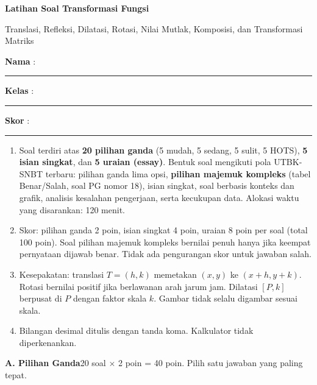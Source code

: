 \documentclass[a4paper,11pt]{article}
\newcounter{no}
\newcommand{\bagian}[2]{\par\Needspace{6\baselineskip}\vspace{1.0em}\noindent
  \begin{tcolorbox}[colback=tealx,colframe=tealx,coltext=white,boxrule=0pt,arc=2pt,left=6pt,right=6pt,top=3pt,bottom=3pt]
  \textbf{#1}\hfill{\small #2}\end{tcolorbox}\setcounter{no}{0}\par\vspace{-0.3em}}
\begin{document}
\thispagestyle{fancy}

\begin{center}
  {\color{tealx}\fontsize{22}{26}\selectfont\bfseries Latihan Soal Transformasi Fungsi\par}
  \vspace{2pt}
  {\color{aquax}\large Translasi, Refleksi, Dilatasi, Rotasi, Nilai Mutlak, Komposisi, dan Transformasi Matriks\par}
\end{center}
\vspace{2pt}
\begin{tcolorbox}[colback=softbg,colframe=tealx!40,boxrule=0.6pt,arc=3pt,left=8pt,right=8pt,top=5pt,bottom=5pt]
\noindent\textbf{Nama} : \rule{4.6cm}{0.4pt}\hfill\textbf{Kelas} : \rule{2.2cm}{0.4pt}\hfill\textbf{Skor} : \rule{2.2cm}{0.4pt}
\end{tcolorbox}
\vspace{2pt}
\begin{tcolorbox}[colback=white,colframe=aquax,boxrule=0.8pt,arc=3pt,left=8pt,right=8pt,top=4pt,bottom=4pt,title={\bfseries Petunjuk Pengerjaan},coltitle=white,fonttitle=\small]
\small
\begin{enumerate}[leftmargin=1.4em,itemsep=1pt,topsep=1pt]
\item Soal terdiri atas \textbf{20 pilihan ganda} (5 mudah, 5 sedang, 5 sulit, 5 HOTS), \textbf{5 isian singkat}, dan \textbf{5 uraian (essay)}. Bentuk soal mengikuti pola UTBK-SNBT terbaru: pilihan ganda lima opsi, \textbf{pilihan majemuk kompleks} (tabel Benar/Salah, soal PG nomor 18), isian singkat, soal berbasis konteks dan grafik, analisis kesalahan pengerjaan, serta kecukupan data. Alokasi waktu yang disarankan: 120 menit.
\item Skor: pilihan ganda 2 poin, isian singkat 4 poin, uraian 8 poin per soal (total 100 poin). Soal pilihan majemuk kompleks bernilai penuh hanya jika keempat pernyataan dijawab benar. Tidak ada pengurangan skor untuk jawaban salah.
\item Kesepakatan: translasi $T=(h,k)$ memetakan $(x,y)$ ke $(x+h,y+k)$. Rotasi bernilai positif jika berlawanan arah jarum jam. Dilatasi $[P,k]$ berpusat di $P$ dengan faktor skala $k$. Gambar tidak selalu digambar sesuai skala.
\item Bilangan desimal ditulis dengan tanda koma. Kalkulator tidak diperkenankan.
\end{enumerate}
\end{tcolorbox}

\bagian{A. Pilihan Ganda}{20 soal $\times$ 2 poin = 40 poin. Pilih satu jawaban yang paling tepat.}
\end{document}
